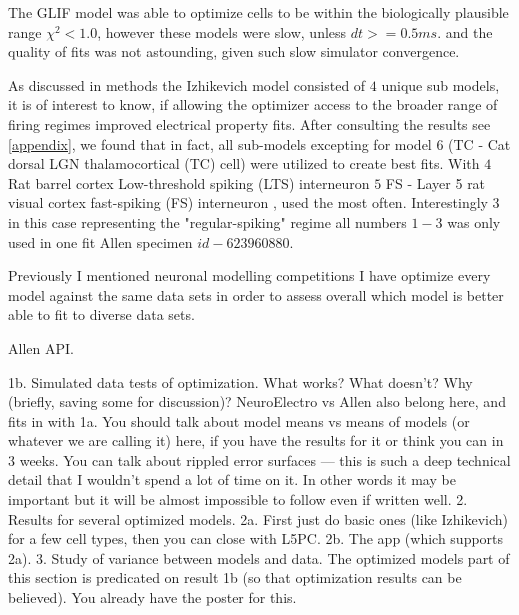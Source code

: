 The GLIF model was able to optimize cells to be within the biologically plausible range $\chi^{2}<1.0$, however these models were slow, unless $dt>=0.5ms$. and the quality of fits was not astounding, given such slow simulator convergence.

As discussed in methods the Izhikevich model consisted of $4$ unique sub models, it is of interest to know, if allowing the optimizer access to the broader range of firing regimes improved electrical property fits. After consulting the results see \ref{appendix}, we found that in fact, all sub-models excepting for model $6$ (TC - Cat dorsal LGN thalamocortical (TC) cell) were utilized to create best fits. With $4$ Rat barrel cortex Low-threshold  spiking (LTS) interneuron 
$5$ FS - Layer 5 rat visual cortex fast-spiking (FS) interneuron , used the most often. Interestingly $3$ in this case representing the "regular-spiking" regime all numbers $1-3$ was only used in one fit Allen specimen $id-623960880$.





Previously I mentioned neuronal modelling competitions I have optimize every model against the same data sets in order to assess overall which model is better able to fit to diverse data sets.


       
       Allen API.
       
       1b. Simulated data tests of optimization.  What works?  What doesn’t?  Why (briefly, saving some for discussion)?  NeuroElectro vs Allen also belong here, and fits in with 1a.  You should talk about model means vs means of models (or whatever we are calling it) here, if you have the results for it or think you can in 3 weeks.  You can talk about rippled error surfaces — this is such a deep technical detail that I wouldn’t spend a lot of time on it.  In other words it may be important but it will be almost impossible to follow even if written well.
2. Results for several optimized models.
    2a. First just do basic ones (like Izhikevich) for a few cell types, then you can close with L5PC.
    2b. The app (which supports 2a).
3. Study of variance between models and data.  The optimized models part of this section is predicated on result 1b (so that optimization results can be believed).  You already have the poster for this.

